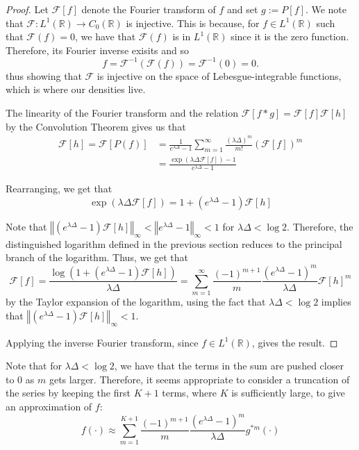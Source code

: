 \documentclass[a4paper,11pt]{article}
\theoremstyle{theorem}
\theoremstyle{definition}
\theoremstyle{remark}
\begin{document}
\begin{proof}
Let $\mathcal{F}[f]$ denote the Fourier transform of $f$ and set $g := P[f]$. We note that $\mathcal{F} : L^{1}(\mathbb{R}) \to C_{0}(\mathbb{R})$ is injective. This is because, for $f \in L^{1}(\mathbb{R})$ such that $\mathcal{F}(f) = 0$, we have that $\mathcal{F}(f)$ is in $L^{1}(\mathbb{R})$ since it is the zero function. Therefore, its Fourier inverse exisits and so
\[
f = \mathcal{F}^{-1}(\mathcal{F}(f)) = \mathcal{F}^{-1}(0) = 0. 
\]
thus showing that $\mathcal{F}$ is injective on the space of Lebesgue-integrable functions, which is where our densities live.

The linearity of the Fourier transform and the relation $\mathcal{F}[f \ast g] = \mathcal{F}[f]\mathcal{F}[h]$ by the Convolution Theorem gives us that
\begin{align*}
\mathcal{F}[h] = \mathcal{F}\left[ P(f) \right] &= \frac{1}{e^{\lambda \Delta} - 1}\sum_{m=1}^{\infty}{\frac{(\lambda \Delta)^m}{m!} (\mathcal{F}[f])^m} \\
&= \frac{\exp\left(\lambda \Delta \mathcal{F}[f]\right) - 1}{e^{\lambda \Delta} - 1}
\end{align*}

Rearranging, we get that
\[
\exp\left(\lambda \Delta \mathcal{F}[f] \right) = 1 + (e^{\lambda \Delta} - 1) \mathcal{F}[h]
\]

Note that $\left\Vert (e^{\lambda \Delta} - 1)\mathcal{F}[h] \right\Vert_{\infty} < \left\Vert e^{\lambda \Delta} - 1 \right\Vert_{\infty} < 1$ for $\lambda \Delta < \log 2$. Therefore, the distinguished logarithm defined in the previous section reduces to the principal branch of the logarithm. Thus, we get that
\begin{equation} \label{inverse}
\mathcal{F}[f] = \frac{\log(1 + (e^{\lambda \Delta} - 1)\mathcal{F}[h])}{\lambda \Delta} = \sum_{m=1}^{\infty}{\frac{(-1)^{m+1}}{m}\frac{(e^{\lambda \Delta} - 1)^m}{\lambda \Delta} {\mathcal{F}[h]}^{m}}
\end{equation}
by the Taylor expansion of the logarithm, using the fact that $\lambda \Delta < \log 2$ implies that $\left\Vert (e^{\lambda \Delta} - 1)\mathcal{F}[h] \right\Vert_{\infty} < 1$.

Applying the inverse Fourier transform, since $f \in L^{1}(\mathbb{R})$, gives the result. 
\end{proof}

Note that for $\lambda \Delta < \log 2$, we have that the terms in the sum are pushed closer to 0 as $m$ gets larger. Therefore, it seems appropriate to consider a truncation of the series by keeping the first $K+1$ terms, where $K$ is sufficiently large, to give an approximation of $f$:
\begin{equation}
f(\cdot) \approx \sum_{m=1}^{K+1}{\frac{(-1)^{m+1}}{m}\frac{(e^{\lambda \Delta} - 1)^m}{\lambda \Delta} g^{\ast m}(\cdot)}
\end{equation}
\end{document}
